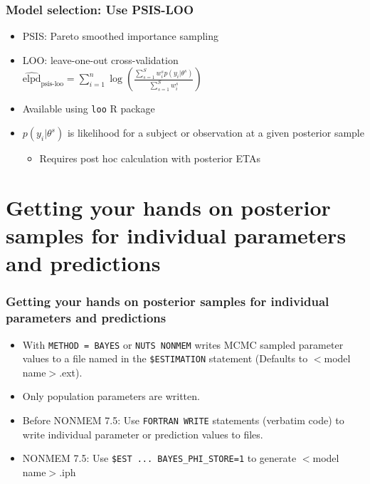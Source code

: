 \documentclass{beamer}
\begin{document}
\begin{frame}[fragile]
  \frametitle{Model selection: Use PSIS-LOO}

\begin{itemize}
  \item \textcolor{mrggreen}{PSIS}: Pareto smoothed importance sampling
  \item \textcolor{mrggreen}{LOO}: leave-one-out cross-validation\\
  \quad $\widehat{\text{elpd}}_{\text{psis-loo}} = \sum_{i=1}^n \log\left(\frac{\sum_{s=1}^S w_i^s p(y_i|\theta^s)}{\sum_{s=1}^S w_i^s}\right)$
  \vspace{1em}
  \item Available using \verb|loo| R package
  \item \textcolor{mrggreen}{$p(y_i|\theta^s)$} is likelihood for a subject or observation at a given posterior sample
        \begin{itemize}
          \item Requires post hoc calculation with posterior ETAs
        \end{itemize}
\end{itemize}

\end{frame}

\section[Getting posterior samples for individual parameters]{Getting
  your hands on posterior samples for individual parameters and
  predictions}

\begin{frame}[fragile]
  \frametitle{Getting your hands on posterior samples for individual
    parameters and predictions}

  \begin{itemize}
  \item<1-> With \verb|METHOD = BAYES| or \verb|NUTS NONMEM| writes MCMC sampled
    parameter values to a file named in the \verb|$ESTIMATION| statement
    (Defaults to $<$model name$>$.ext).
  \item<2-> Only population parameters are written.
  \item<3-> Before NONMEM 7.5: Use \verb|FORTRAN WRITE| statements (verbatim code) to write
    individual parameter or prediction values to files.
  \item<4-> NONMEM 7.5: Use \verb|$EST ... BAYES_PHI_STORE=1| to generate $<$model name$>$.iph
  \end{itemize}
  
\end{frame}
\end{document}
